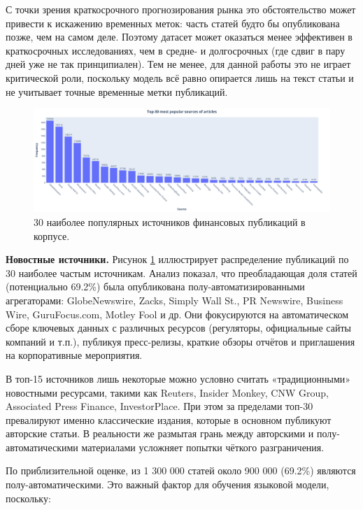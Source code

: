 С точки зрения краткосрочного прогнозирования рынка это обстоятельство может привести к искажению временных меток:
часть статей будто бы опубликована позже, чем на самом деле. Поэтому датасет может оказаться менее эффективен
в краткосрочных исследованиях, чем в средне- и долгосрочных (где сдвиг в пару дней уже не так принципиален).
Тем не менее, для данной работы это не играет критической роли, поскольку модель всё равно опирается лишь
на текст статьи и не учитывает точные временные метки публикаций.

\begin{figure}[H]
    \centering
    \includegraphics[width=1\linewidth]{img/top30_sources.png}
    \caption{\label{fig:dist_sources}30 наиболее популярных источников финансовых публикаций в корпусе.}
\end{figure}

\textbf{Новостные источники.} Рисунок \ref{fig:dist_sources} иллюстрирует распределение публикаций по 30 наиболее частым источникам.
Анализ показал, что преобладающая доля статей (потенциально 69.2\%) была опубликована полу-автоматизированными агрегаторами:
GlobeNewswire, Zacks, Simply Wall St., PR Newswire, Business Wire, GuruFocus.com, Motley Fool и др. Они фокусируются
на автоматическом сборе ключевых данных с различных ресурсов (регуляторы, официальные сайты компаний и т.п.), публикуя
пресс-релизы, краткие обзоры отчётов и приглашения на корпоративные мероприятия.

В топ-15 источников лишь некоторые можно условно считать «традиционными» новостными ресурсами, такими как Reuters,
Insider Monkey, CNW Group, Associated Press Finance, InvestorPlace. При этом за пределами топ-30 превалируют именно
классические издания, которые в основном публикуют авторские статьи. В реальности же размытая грань между авторскими
и полу-автоматическими материалами усложняет попытки чёткого разграничения.

По приблизительной оценке, из 1 300 000 статей около 900 000 (69.2\%) являются полу-автоматическими.
Это важный фактор для обучения языковой модели, поскольку:

